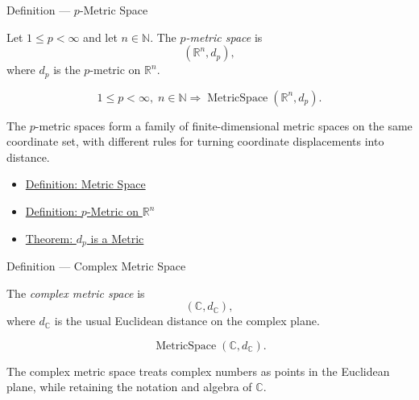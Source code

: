 \begin{definitionbox}{Definition --- \(p\)-Metric Space}
\begin{definition}\label{def:lp-metric-space}
Let \(1\leq p<\infty\) and let \(n\in\mathbb{N}\).  The \emph{\(p\)-metric
space} is
\[
  (\mathbb{R}^n,d_p),
\]
where \(d_p\) is the \(p\)-metric on \(\mathbb{R}^n\).
\end{definition}
\end{definitionbox}

\begin{remark*}
\[
1\leq p<\infty,\; n\in\mathbb{N}
\Longrightarrow
\operatorname{MetricSpace}(\mathbb{R}^n,d_p).
\]
\end{remark*}

\begin{remark*}[Interpretation]
The \(p\)-metric spaces form a family of finite-dimensional metric spaces on
the same coordinate set, with different rules for turning coordinate
displacements into distance.
\end{remark*}

\begin{dependencies}
\begin{itemize}
  \item \hyperref[def:metric-space]{Definition: Metric Space}
  \item \hyperref[def:lp-metric-rn]{Definition: \(p\)-Metric on \(\mathbb{R}^n\)}
  \item \hyperref[thm:lp-metric-rn]{Theorem: \(d_p\) is a Metric}
\end{itemize}
\end{dependencies}

\begin{definitionbox}{Definition --- Complex Metric Space}
\begin{definition}\label{def:complex-metric-space}
The \emph{complex metric space} is
\[
  (\mathbb{C},d_{\mathbb{C}}),
\]
where \(d_{\mathbb{C}}\) is the usual Euclidean distance on the complex plane.
\end{definition}
\end{definitionbox}

\begin{remark*}
\[
\operatorname{MetricSpace}(\mathbb{C},d_{\mathbb{C}}).
\]
\end{remark*}

\begin{remark*}[Interpretation]
The complex metric space treats complex numbers as points in the Euclidean
plane, while retaining the notation and algebra of \(\mathbb{C}\).
\end{remark*}

